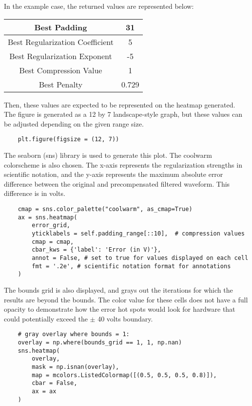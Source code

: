 \documentclass[11pt, a4paper]{article}
\theoremstyle{definition}
\numberwithin{equation}{section}
\begin{document}
In the example case, the returned values are represented below:

\begin{center}
\begin{tabular}{ | c | c | } 
  \hline
   Best Padding & 31 \\ 
  \hline
  Best Regularization Coefficient & 5 \\ 
  \hline
  Best Regularization Exponent & -5 \\ 
  \hline
  Best Compression Value & 1 \\ 
  \hline
  Best Penalty & 0.729 \\ 
  \hline
\end{tabular}
\end{center}

Then, these values are expected to be represented on the heatmap generated.
\\
The figure is generated as a 12 by 7 landscape-style graph, but these values can be adjusted depending on the given range size.

\begin{verbatim}
    plt.figure(figsize = (12, 7))
\end{verbatim}

The seaborn (sns) library is used to generate this plot. The coolwarm colorscheme is also chosen. The x-axis represents the regularization strengths in scientific notation, and the y-axis represents the maximum absolute error difference between the original and precompensated filtered waveform. This difference is in volts.

\begin{verbatim}
    cmap = sns.color_palette("coolwarm", as_cmap=True)
    ax = sns.heatmap(
        error_grid,
        yticklabels = self.padding_range[::10],  # compression values
        cmap = cmap,
        cbar_kws = {'label': 'Error (in V)'},
        annot = False, # set to true for values displayed on each cell
        fmt = '.2e', # scientific notation format for annotations
    )
\end{verbatim}

The bounds grid is also displayed, and grays out the iterations for which the results are beyond the bounds. The color value for these cells does not have a full opacity to demonstrate how the error hot spots would look for hardware that could potentially exceed the $\pm$ 40 volts boundary.

\begin{verbatim}
    # gray overlay where bounds = 1:
    overlay = np.where(bounds_grid == 1, 1, np.nan)
    sns.heatmap(
        overlay,
        mask = np.isnan(overlay),
        map = mcolors.ListedColormap([(0.5, 0.5, 0.5, 0.8)]),
        cbar = False,
        ax = ax
    )
\end{verbatim}
\end{document}
